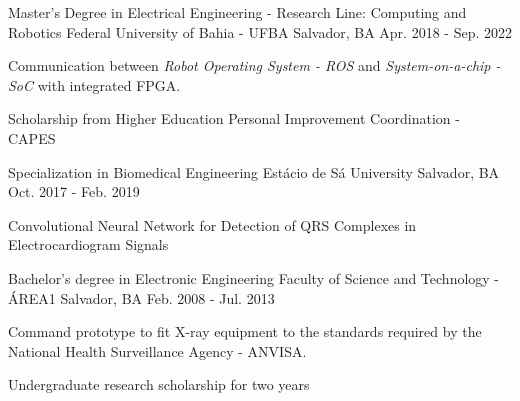 

\begin{cventries}
  

  \cventry
    {Master's Degree in Electrical Engineering - Research Line: Computing and Robotics} %
    {Federal University of Bahia - UFBA} %
    {Salvador, BA} %
    {Apr. 2018 - Sep. 2022} %
    {
      \begin{cvitems} %
        \item {Communication between \textit{Robot Operating System - ROS} and \textit{System-on-a-chip - SoC} with integrated FPGA.}
        \item {Scholarship from Higher Education Personal Improvement Coordination - CAPES }
      \end{cvitems}
    }


  \cventry
    {Specialization in Biomedical Engineering} %
    {Estácio de Sá University} %
    {Salvador, BA} %
    {Oct. 2017 - Feb. 2019} %
    {
      \begin{cvitems} %
        \item {Convolutional Neural Network for Detection of QRS Complexes in Electrocardiogram Signals}
      \end{cvitems}
    }


  \cventry
    {Bachelor's degree in Electronic Engineering} %
    {Faculty of Science and Technology - ÁREA1} %
    {Salvador, BA} %
    {Feb. 2008 - Jul. 2013} %
    {
      \begin{cvitems} %
        \item {Command prototype to fit X-ray equipment to the standards required by the National Health Surveillance Agency - ANVISA.}
        \item {Undergraduate research scholarship for two years}
      \end{cvitems}
    }


\end{cventries}
